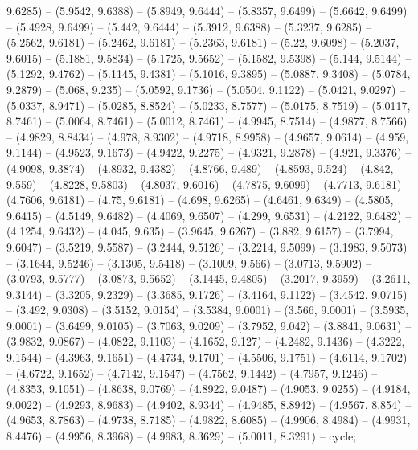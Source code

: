 9.6285) -- (5.9542, 9.6388) -- (5.8949, 9.6444) -- (5.8357, 9.6499) -- (5.6642, 9.6499) -- (5.4928, 9.6499) -- (5.442, 9.6444) -- (5.3912, 9.6388) -- (5.3237, 9.6285) -- (5.2562, 9.6181) -- (5.2462, 9.6181) -- (5.2363, 9.6181) -- (5.22, 9.6098) -- (5.2037, 9.6015) -- (5.1881, 9.5834) -- (5.1725, 9.5652) -- (5.1582, 9.5398) -- (5.144, 9.5144) -- (5.1292, 9.4762) -- (5.1145, 9.4381) -- (5.1016, 9.3895) -- (5.0887, 9.3408) -- (5.0784, 9.2879) -- (5.068, 9.235) -- (5.0592, 9.1736) -- (5.0504, 9.1122) -- (5.0421, 9.0297) -- (5.0337, 8.9471) -- (5.0285, 8.8524) -- (5.0233, 8.7577) -- (5.0175, 8.7519) -- (5.0117, 8.7461) -- (5.0064, 8.7461) -- (5.0012, 8.7461) -- (4.9945, 8.7514) -- (4.9877, 8.7566) -- (4.9829, 8.8434) -- (4.978, 8.9302) -- (4.9718, 8.9958) -- (4.9657, 9.0614) -- (4.959, 9.1144) -- (4.9523, 9.1673) -- (4.9422, 9.2275) -- (4.9321, 9.2878) -- (4.921, 9.3376) -- (4.9098, 9.3874) -- (4.8932, 9.4382) -- (4.8766, 9.489) -- (4.8593, 9.524) -- (4.842, 9.559) -- (4.8228, 9.5803) -- (4.8037, 9.6016) -- (4.7875, 9.6099) -- (4.7713, 9.6181) -- (4.7606, 9.6181) -- (4.75, 9.6181) -- (4.698, 9.6265) -- (4.6461, 9.6349) -- (4.5805, 9.6415) -- (4.5149, 9.6482) -- (4.4069, 9.6507) -- (4.299, 9.6531) -- (4.2122, 9.6482) -- (4.1254, 9.6432) -- (4.045, 9.635) -- (3.9645, 9.6267) -- (3.882, 9.6157) -- (3.7994, 9.6047) -- (3.5219, 9.5587) -- (3.2444, 9.5126) -- (3.2214, 9.5099) -- (3.1983, 9.5073) -- (3.1644, 9.5246) -- (3.1305, 9.5418) -- (3.1009, 9.566) -- (3.0713, 9.5902) -- (3.0793, 9.5777) -- (3.0873, 9.5652) -- (3.1445, 9.4805) -- (3.2017, 9.3959) -- (3.2611, 9.3144) -- (3.3205, 9.2329) -- (3.3685, 9.1726) -- (3.4164, 9.1122) -- (3.4542, 9.0715) -- (3.492, 9.0308) -- (3.5152, 9.0154) -- (3.5384, 9.0001) -- (3.566, 9.0001) -- (3.5935, 9.0001) -- (3.6499, 9.0105) -- (3.7063, 9.0209) -- (3.7952, 9.042) -- (3.8841, 9.0631) -- (3.9832, 9.0867) -- (4.0822, 9.1103) -- (4.1652, 9.127) -- (4.2482, 9.1436) -- (4.3222, 9.1544) -- (4.3963, 9.1651) -- (4.4734, 9.1701) -- (4.5506, 9.1751) -- (4.6114, 9.1702) -- (4.6722, 9.1652) -- (4.7142, 9.1547) -- (4.7562, 9.1442) -- (4.7957, 9.1246) -- (4.8353, 9.1051) -- (4.8638, 9.0769) -- (4.8922, 9.0487) -- (4.9053, 9.0255) -- (4.9184, 9.0022) -- (4.9293, 8.9683) -- (4.9402, 8.9344) -- (4.9485, 8.8942) -- (4.9567, 8.854) -- (4.9653, 8.7863) -- (4.9738, 8.7185) -- (4.9822, 8.6085) -- (4.9906, 8.4984) -- (4.9931, 8.4476) -- (4.9956, 8.3968) -- (4.9983, 8.3629) -- (5.0011, 8.3291) -- cycle;



